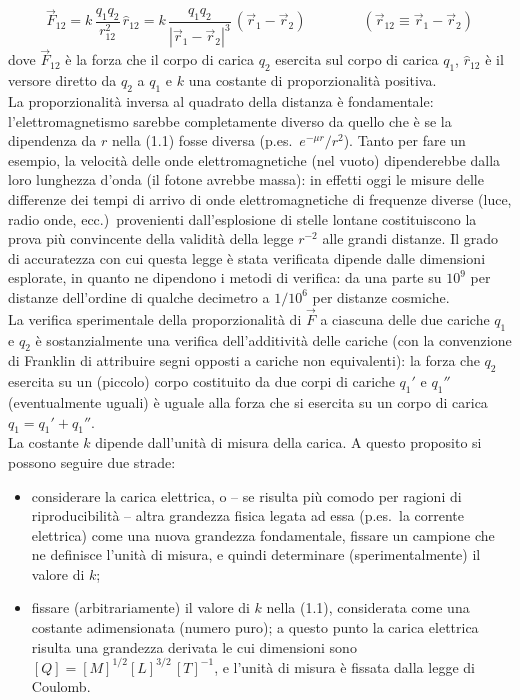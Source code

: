 \begin{equation}
\vec F_{12} = k\,\frac{q_1q_2}{r_{12}^2}\,\hat r_{12} = k\,\frac{q_1q_2}{|\vec r_1-\vec r_2|^3}\,(\vec r_1-\vec r_2)
\qquad\qquad (\vec r_{12}\equiv\vec r_1-\vec r_2)
\tag{1.1}
\end{equation}
dove $\vec F_{12}$ è la forza che il corpo di carica $q_2$ esercita sul corpo di carica $q_1$, $\hat r_{12}$ è il versore diretto da $q_2$ a $q_1$ e $k$ una costante di proporzionalità positiva.\\
La proporzionalità inversa al quadrato della distanza è fondamentale: l'elettromagnetismo sarebbe completamente diverso da quello che è se la dipendenza da $r$ nella (1.1) fosse diversa (p.es.\ $e^{-\mu r}/r^2$). Tanto per fare un esempio, la velocità delle onde elettromagnetiche (nel vuoto) dipenderebbe dalla loro lunghezza d'onda (il fotone avrebbe massa): in effetti oggi le misure delle differenze dei tempi di arrivo di onde elettromagnetiche di frequenze diverse (luce, radio onde, ecc.)\ provenienti dall'esplosione di stelle lontane costituiscono la prova più convincente della validità della legge $r^{-2}$ alle grandi distanze. Il grado di accuratezza con cui questa legge è stata verificata dipende dalle dimensioni esplorate, in quanto ne dipendono i metodi di verifica: da una parte su $10^9$ per distanze dell'ordine di qualche decimetro a $1/10^6$ per distanze cosmiche.\\
La verifica sperimentale della proporzionalità di $\vec F$ a ciascuna delle due cariche $q_1$ e $q_2$ è sostanzialmente una verifica dell'additività delle cariche (con la convenzione di Franklin di attribuire segni opposti a cariche non equivalenti): la forza che $q_2$ esercita su un (piccolo) corpo costituito da due corpi di cariche $q_1'$ e $q_1''$ (eventualmente uguali) è uguale alla forza che si esercita su un corpo di carica $q_1=q_1'+q_1''$.\\
La costante $k$ dipende dall'unità di misura della carica. A questo proposito si possono seguire due strade:
\begin{itemize}
\item[i)] considerare la carica elettrica, o -- se risulta più comodo per ragioni di riproducibilità -- altra grandezza fisica legata ad essa (p.es.\ la corrente elettrica) come una nuova grandezza fondamentale, fissare un campione che ne definisce l'unità di misura, e quindi determinare (sperimentalmente) il valore di $k$;
\item[ii)] fissare (arbitrariamente) il valore di $k$ nella (1.1), considerata come una costante adimensionata (numero puro); a questo punto la carica elettrica risulta una grandezza derivata le cui dimensioni sono $[Q]=[M]^{1/2}[L]^{3/2}\,[T]^{-1}$, e l'unità di misura è fissata dalla legge di Coulomb.
\end{itemize}
